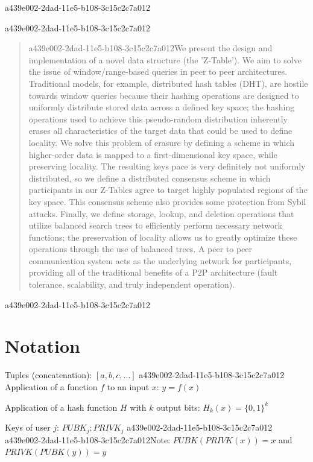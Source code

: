 \documentclass[12pt]{article}
\begin{document}
a439e002-2dad-11e5-b108-3c15c2c7a012
\maketitle
a439e002-2dad-11e5-b108-3c15c2c7a012
\begin{abstract}
a439e002-2dad-11e5-b108-3c15c2c7a012We present the design and implementation of a novel data structure (the 'Z-Table'). We aim to solve the issue of window/range-based queries in peer to peer architectures. Traditional models, for example,  distributed hash tables (DHT), are hostile towards window queries because their hashing operations are designed to uniformly distribute stored data across a defined key space; the hashing operations used to achieve this pseudo-random distribution inherently erases all characteristics of the target data that could be used to define locality. We solve this problem of erasure by defining a scheme in which higher-order data is mapped to a first-dimensional key space, while preserving locality. The resulting keys pace is very definitely not uniformly distributed, so we define a distributed consensus scheme in which participants in our Z-Tables agree to target highly populated regions of the key space. This consensus scheme also provides some protection from Sybil attacks. Finally, we define storage, lookup, and deletion operations that utilize balanced search trees to efficiently perform necessary network functions; the preservation of locality allows us to greatly optimize these operations through the use of balanced trees. A peer to peer communication system acts as the underlying network for participants, providing all of the traditional benefits of a P2P architecture (fault tolerance, scalability, and truly independent operation).
\end{abstract}
a439e002-2dad-11e5-b108-3c15c2c7a012
\section{Notation}

Tuples (concatenation): $[a,b,c,...]$
a439e002-2dad-11e5-b108-3c15c2c7a012
Application of a function $f$ to an input $x$: $y=f(x)$

Application of a hash function $H$ with $k$ output bits: $H_{k}(x) = \{0,1\}^k$

Keys of user $j$: $ PUBK_j; PRIVK_j $
a439e002-2dad-11e5-b108-3c15c2c7a012
a439e002-2dad-11e5-b108-3c15c2c7a012Note: $PUBK(PRIVK(x)) = x$ and $PRIVK(PUBK(y)) = y$~
\end{document}
